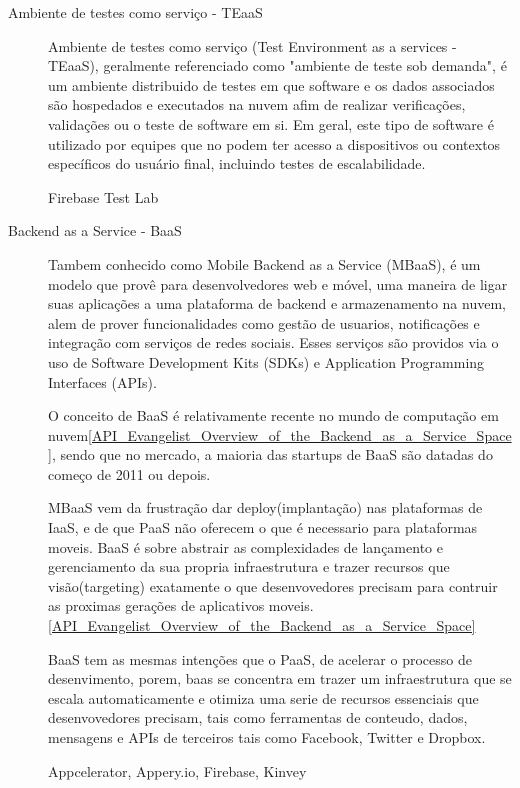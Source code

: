 \begin{description}
		\item[Ambiente de testes como serviço - TEaaS]
		Ambiente de testes como serviço (Test Environment as a services - TEaaS), geralmente referenciado como "ambiente de teste sob demanda", é um ambiente distribuido de testes em que software e os dados associados são hospedados e executados na nuvem afim de realizar verificações, validações ou o teste de software em si. Em geral, este tipo de software é utilizado por equipes que no podem ter acesso a dispositivos ou contextos específicos do usuário final, incluindo testes de escalabilidade.
	
		Firebase Test Lab

		\item[Backend as a Service - BaaS]
		Tambem conhecido como Mobile Backend as a Service (MBaaS), é um modelo que provê para desenvolvedores web e móvel, uma maneira de ligar suas aplicações a uma plataforma de backend e armazenamento na nuvem, alem de prover funcionalidades como gestão de usuarios, notificações e integração com serviços de redes sociais. Esses serviços são providos via o uso de Software Development Kits (SDKs) e Application Programming Interfaces (APIs). 
	
		O conceito de BaaS é relativamente recente no mundo de computação em nuvem\ref{API_Evangelist_Overview_of_the_Backend_as_a_Service_Space}, sendo que no mercado, a maioria das startups de BaaS são datadas do começo de 2011 ou depois.

		MBaaS vem da frustração dar deploy(implantação) nas plataformas de IaaS, e de que PaaS não oferecem o que é necessario para plataformas moveis. BaaS é sobre abstrair as complexidades de lançamento e gerenciamento da sua propria infraestrutura e trazer recursos que visão(targeting) exatamente o que desenvovedores precisam para contruir as proximas gerações de aplicativos moveis.\ref{API_Evangelist_Overview_of_the_Backend_as_a_Service_Space}

		BaaS tem as mesmas intenções que o PaaS, de acelerar o processo de desenvimento, porem, baas se concentra em trazer um infraestrutura que se escala automaticamente e otimiza uma serie de recursos essenciais que desenvovedores precisam, tais como ferramentas de conteudo, dados, mensagens e APIs de terceiros tais como Facebook, Twitter e Dropbox.


		Appcelerator, Appery.io, Firebase, Kinvey

		\end{description}

